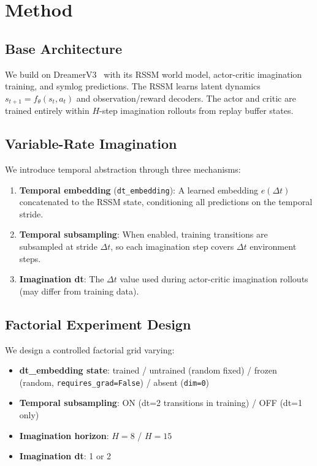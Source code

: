 \documentclass[10pt,letterpaper]{article}
\begin{document}
\section{Method}
\label{sec:method}

\subsection{Base Architecture}

We build on DreamerV3~\citep{hafner2023dreamerv3} with its RSSM world model, actor-critic imagination training, and symlog predictions.
The RSSM learns latent dynamics $s_{t+1} = f_\theta(s_t, a_t)$ and observation/reward decoders.
The actor and critic are trained entirely within $H$-step imagination rollouts from replay buffer states.

\subsection{Variable-Rate Imagination}

We introduce temporal abstraction through three mechanisms:
\begin{enumerate}
    \item \textbf{Temporal embedding} (\texttt{dt\_embedding}): A learned embedding $e(\Delta t)$ concatenated to the RSSM state, conditioning all predictions on the temporal stride.
    \item \textbf{Temporal subsampling}: When enabled, training transitions are subsampled at stride $\Delta t$, so each imagination step covers $\Delta t$ environment steps.
    \item \textbf{Imagination dt}: The $\Delta t$ value used during actor-critic imagination rollouts (may differ from training data).
\end{enumerate}

\subsection{Factorial Experiment Design}

We design a controlled factorial grid varying:
\begin{itemize}
    \item \textbf{dt\_embedding state}: trained / untrained (random fixed) / frozen (random, \texttt{requires\_grad=False}) / absent (\texttt{dim=0})
    \item \textbf{Temporal subsampling}: ON (dt=2 transitions in training) / OFF (dt=1 only)
    \item \textbf{Imagination horizon}: $H=8$ / $H=15$
    \item \textbf{Imagination dt}: 1 or 2
\end{itemize}
\end{document}
